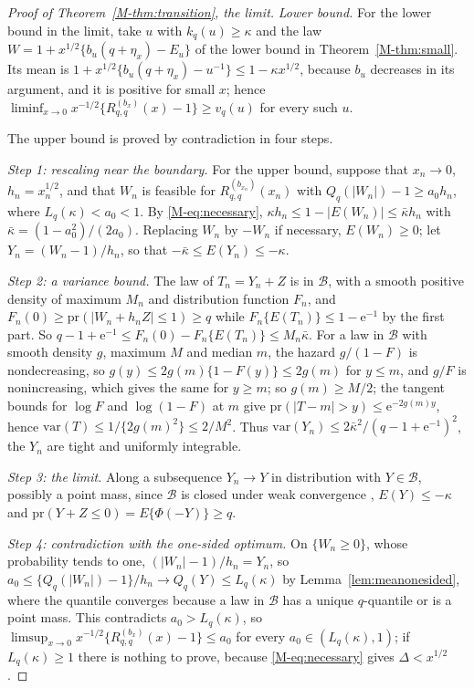 \documentclass[11pt]{article}
\renewcommand{\_}{\usc\allowbreak}
\newcommand{\pr}{\mathrm{pr}}
\newcommand{\var}{\mathrm{var}}
\begin{document}
\begin{proof}[Proof of Theorem~\ref{M-thm:transition}, the limit]
\emph{Lower bound.} For the lower bound in the limit, take $u$ with $k_q(u) \ge \kappa$ and the law $W = 1 + x^{1/2}\{b_u(q + \eta_x) - E_u\}$ of the lower bound in Theorem~\ref{M-thm:small}. Its mean is $1 + x^{1/2}\{b_u(q + \eta_x) - u^{-1}\} \le 1 - \kappa x^{1/2}$, because $b_u$ decreases in its argument, and it is positive for small $x$; hence $\liminf_{x\to0} x^{-1/2}\{R^{(b_x)}_{q,q}(x) - 1\} \ge v_q(u)$ for every such $u$.

The upper bound is proved by contradiction in four steps.

\emph{Step 1: rescaling near the boundary.} For the upper bound, suppose that $x_n \to 0$, $h_n = x_n^{1/2}$, and that $W_n$ is feasible for $R^{(b_{x_n})}_{q,q}(x_n)$ with $Q_q(|W_n|) - 1 \ge a_0 h_n$, where $L_q(\kappa) < a_0 < 1$. By \eqref{M-eq:necessary}, $\kappa h_n \le 1 - |E(W_n)| \le \bar\kappa h_n$ with $\bar\kappa = (1 - a_0^2)/(2a_0)$. Replacing $W_n$ by $-W_n$ if necessary, $E(W_n) \ge 0$; let $Y_n = (W_n - 1)/h_n$, so that $-\bar\kappa \le E(Y_n) \le -\kappa$.

\emph{Step 2: a variance bound.} The law of $T_n = Y_n + Z$ is in $\mathcal B$, with a smooth positive density of maximum $M_n$ and distribution function $F_n$, and $F_n(0) \ge \pr(|W_n + h_nZ| \le 1) \ge q$ while $F_n\{E(T_n)\} \le 1 - \mathrm{e}^{-1}$ by the first part. So $q - 1 + \mathrm{e}^{-1} \le F_n(0) - F_n\{E(T_n)\} \le M_n \bar\kappa$. For a law in $\mathcal B$ with smooth density $g$, maximum $M$ and median $m$, the hazard $g/(1 - F)$ is nondecreasing, so $g(y) \le 2g(m)\{1 - F(y)\} \le 2g(m)$ for $y \le m$, and $g/F$ is nonincreasing, which gives the same for $y \ge m$; so $g(m) \ge M/2$; the tangent bounds for $\log F$ and $\log(1-F)$ at $m$ give $\pr(|T - m| > y) \le \mathrm{e}^{-2g(m)y}$, hence $\var(T) \le 1/\{2g(m)^2\} \le 2/M^2$. Thus $\var(Y_n) \le 2\bar\kappa^2/(q - 1 + \mathrm{e}^{-1})^2$, the $Y_n$ are tight and uniformly integrable.

\emph{Step 3: the limit.} Along a subsequence $Y_n \to Y$ in distribution with $Y \in \mathcal B$, possibly a point mass, since $\mathcal B$ is closed under weak convergence \citep{saumard2019}, $E(Y) \le -\kappa$ and $\pr(Y + Z \le 0) = E\{\Phi(-Y)\} \ge q$.

\emph{Step 4: contradiction with the one-sided optimum.} On $\{W_n \ge 0\}$, whose probability tends to one, $(|W_n| - 1)/h_n = Y_n$, so $a_0 \le \{Q_q(|W_n|) - 1\}/h_n \to Q_q(Y) \le L_q(\kappa)$ by Lemma~\ref{lem:meanonesided}, where the quantile converges because a law in $\mathcal B$ has a unique $q$-quantile or is a point mass. This contradicts $a_0 > L_q(\kappa)$, so $\limsup_{x\to0} x^{-1/2}\{R^{(b_x)}_{q,q}(x) - 1\} \le a_0$ for every $a_0 \in (L_q(\kappa), 1)$; if $L_q(\kappa) \ge 1$ there is nothing to prove, because \eqref{M-eq:necessary} gives $\Delta < x^{1/2}$.
\end{proof}
\end{document}
